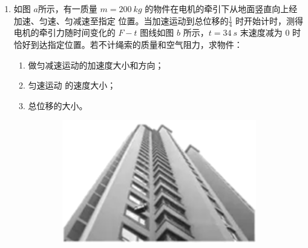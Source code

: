 \begin{enumerate}

\newpage
\item
如图 $ a $所示，有一质量 $ m=200 \ kg $ 的物件在电机的牵引下从地面竖直向上经加速、匀速、匀减速至指定
位置。当加速运动到总位移的$ \frac{ 1 }{ 4 } $
时开始计时，测得电机的牵引力随时间变化的 $ F-t $ 图线如图 $ b $ 所示，$ t=34 \ s $
末速度减为 $ 0 $ 时恰好到达指定位置。若不计绳索的质量和空气阻力，求物件：
\begin{enumerate}
\item
做匀减速运动的加速度大小和方向；



\item 
匀速运动 的速度大小；

\item 
总位移的大小。

\end{enumerate}
\begin{figure}[h!]
\flushright 
\begin{subfigure}{0.4\linewidth}
\centering
\includegraphics[width=0.7\linewidth]{picture/screenshot052}
\caption{}\label{}
\end{subfigure}
\begin{subfigure}{0.4\linewidth}
\centering
 
\caption{}\label{}
\end{subfigure}
\end{figure}







\end{enumerate}
